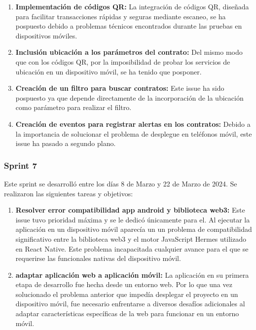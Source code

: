 \begin{enumerate}

\item \textbf{Implementación de códigos QR:} La integración de códigos QR, diseñada para facilitar transacciones rápidas y seguras mediante escaneo, se ha pospuesto debido a problemas técnicos encontrados durante las pruebas en dispositivos móviles.

\item \textbf{Inclusión ubicación a los parámetros del contrato:} Del mismo modo que con los códigos QR, por la imposibilidad de probar los servicios de ubicación en un dispositivo móvil, se ha tenido que posponer.

\item \textbf{Creación de un filtro para buscar contratos:}  Este issue ha sido pospuesto ya que depende directamente de la incorporación de la ubicación como parámetro para realizar el filtro.

\item \textbf{Creación de eventos para registrar alertas en los contratos:} Debido a la importancia de solucionar el problema de desplegue en teléfonos móvil, este issue ha pasado a segundo plano.

\end{enumerate}


\subsubsection{Sprint 7}

Este sprint se desarrolló entre los días 8 de Marzo y 22 de Marzo de 2024. Se realizaron las siguientes tareas y objetivos:

\begin{enumerate}

\item \textbf{Resolver error compatibilidad app android y biblioteca web3:} Este issue tuvo prioridad máxima y se le dedicó únicamente para el. Al ejecutar la aplicación en un dispositivo móvil aparecía un un problema de compatibilidad significativo entre la biblioteca web3 y el motor JavaScript Hermes utilizado en React Native.
Este problema incapacitada cualquier avance para el que se requerirse las funcionales nativas del dispositivo móvil.

\item \textbf{adaptar aplicación web a aplicación móvil:} La aplicación en su primera etapa de desarrollo fue hecha desde un entorno web. Por lo que una vez solucionado el problema anterior que impedía desplegar el proyecto en un dispositivo móvil, fue necesario enfrentarse a diversos desafíos adicionales al adaptar características específicas de la web para funcionar en un entorno móvil.

\end{enumerate}

